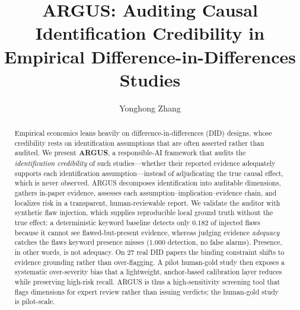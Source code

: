 \documentclass[runningheads]{llncs}
\begin{document}
\title{ARGUS: Auditing Causal Identification Credibility in
Empirical Difference-in-Differences Studies}

\author{Yonghong Zhang}

\maketitle

\begin{abstract}
Empirical economics leans heavily on difference-in-differences (DID) designs,
whose credibility rests on identification assumptions that are often asserted
rather than audited. We present \textbf{ARGUS}, a responsible-AI framework that
audits the \emph{identification credibility} of such studies---whether their
reported evidence adequately supports each identification assumption---instead of
adjudicating the true causal effect, which is never observed. ARGUS decomposes
identification into auditable dimensions, gathers in-paper evidence, assesses each
assumption--implication--evidence chain, and localizes risk in a transparent,
human-reviewable report. We validate the auditor with synthetic flaw injection,
which supplies reproducible local ground truth without the true effect: a
deterministic keyword baseline detects only $0.182$ of injected flaws because it
cannot see flawed-but-present evidence, whereas judging evidence \emph{adequacy}
catches the flaws keyword presence misses ($1.000$ detection, no false alarms).
Presence, in other words, is not adequacy. On 27 real DID papers the binding
constraint shifts to evidence grounding rather than over-flagging. A pilot
human-gold study then exposes a systematic over-severity bias that a lightweight,
anchor-based calibration layer reduces while preserving high-risk recall. ARGUS is
thus a high-sensitivity screening tool that flags dimensions for expert review
rather than issuing verdicts; the human-gold study is pilot-scale.
\end{abstract}











\end{document}
